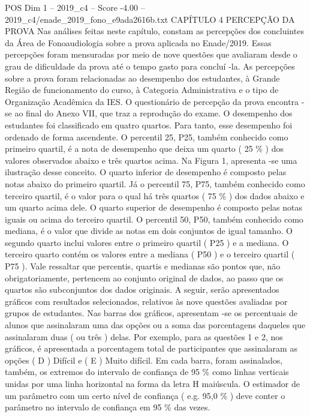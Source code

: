 \begin{textsample}{POS Dim 1 – 2019\_c4 – Score -4.00 – 2019\_c4/enade\_2019\_fono\_e9ada2616b.txt}  \label{ex:f1_pos_347}
CAPÍTULO 4 PERCEPÇÃO DA PROVA Nas análises feitas neste capítulo, constam as percepções dos concluintes da Área de Fonoaudiologia sobre a prova aplicada no Enade/2019.
Essas percepções foram mensuradas por meio de nove questões que avaliaram desde o grau de dificuldade da prova até o tempo gasto para concluí -la.
As percepções sobre a prova foram relacionadas ao desempenho dos estudantes, à Grande Região de funcionamento do curso, à Categoria Administrativa e o tipo de Organização Acadêmica da IES.
O questionário de percepção da prova encontra -se ao final do Anexo VII, que traz a reprodução do exame.
O desempenho dos estudantes foi classificado em quatro quartos.
Para tanto, esse desempenho foi ordenado de forma ascendente.
O percentil 25, P25, também conhecido como primeiro quartil, é a nota de desempenho que deixa um quarto ( 25 \% ) dos valores observados abaixo e três quartos acima.
Na Figura 1, apresenta -se uma ilustração desse conceito.
O quarto inferior de desempenho é composto pelas notas abaixo do primeiro quartil.
Já o percentil 75, P75, também conhecido como terceiro quartil, é o valor para o qual há três quartos ( 75 \% ) dos dados abaixo e um quarto acima dele.
O quarto superior de desempenho é composto pelas notas iguais ou acima do terceiro quartil.
O percentil 50, P50, também conhecido como mediana, é o valor que divide as notas em dois conjuntos de igual tamanho.
O segundo quarto inclui valores entre o primeiro quartil ( P25 ) e a mediana.
O terceiro quarto contém os valores entre a mediana ( P50 ) e o terceiro quartil ( P75 ).
Vale ressaltar que percentis, quartis e medianas são pontos que, não obrigatoriamente, pertencem ao conjunto original de dados, ao passo que os quartos são subconjuntos dos dados originais.
A seguir, serão apresentados gráficos com resultados selecionados, relativos às nove questões avaliadas por grupos de estudantes.
Nas barras dos gráficos, apresentam -se os percentuais de alunos que assinalaram uma das opções ou a soma das porcentagens daqueles que assinalaram duas ( ou três ) delas.
Por exemplo, para as questões 1 e 2, nos gráficos, é apresentada a porcentagem total de participantes que assinalaram as opções ( D ) Difícil e ( E ) Muito difícil.
Em cada barra, foram assinalados, também, os extremos do intervalo de confiança de 95 \% como linhas verticais unidas por uma linha horizontal na forma da letra H maiúscula.
O estimador de um parâmetro com um certo nível de confiança ( e.g. 95,0 \% ) deve conter o parâmetro no intervalo de confiança em 95 \% das vezes.

\end{textsample}
